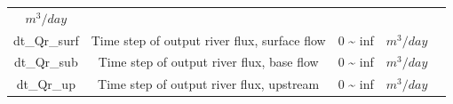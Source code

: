 \documentclass[]{scrbook}
\begin{document}
\begin{longtable}[]{@{}ccccc@{}}
\begin{minipage}[t]{0.10\columnwidth}
\(m^3/day\)\strut
\end{minipage} & \begin{minipage}[t]{0.26\columnwidth}\centering\strut
\strut
\end{minipage}\tabularnewline
\begin{minipage}[t]{0.17\columnwidth}\centering\strut
dt\_Qr\_surf\strut
\end{minipage} & \begin{minipage}[t]{0.23\columnwidth}\centering\strut
Time step of output river flux, surface flow\strut
\end{minipage} & \begin{minipage}[t]{0.10\columnwidth}\centering\strut
0 \textasciitilde{} inf\strut
\end{minipage} & \begin{minipage}[t]{0.10\columnwidth}\centering\strut
\(m^3/day\)\strut
\end{minipage} & \begin{minipage}[t]{0.26\columnwidth}\centering\strut
\strut
\end{minipage}\tabularnewline
\begin{minipage}[t]{0.17\columnwidth}\centering\strut
dt\_Qr\_sub\strut
\end{minipage} & \begin{minipage}[t]{0.23\columnwidth}\centering\strut
Time step of output river flux, base flow\strut
\end{minipage} & \begin{minipage}[t]{0.10\columnwidth}\centering\strut
0 \textasciitilde{} inf\strut
\end{minipage} & \begin{minipage}[t]{0.10\columnwidth}\centering\strut
\(m^3/day\)\strut
\end{minipage} & \begin{minipage}[t]{0.26\columnwidth}\centering\strut
\strut
\end{minipage}\tabularnewline
\begin{minipage}[t]{0.17\columnwidth}\centering\strut
dt\_Qr\_up\strut
\end{minipage} & \begin{minipage}[t]{0.23\columnwidth}\centering\strut
Time step of output river flux, upstream\strut
\end{minipage} & \begin{minipage}[t]{0.10\columnwidth}\centering\strut
0 \textasciitilde{} inf\strut
\end{minipage} & \begin{minipage}[t]{0.10\columnwidth}\centering\strut
\(m^3/day\)\strut
\end{minipage} & \begin{minipage}[t]{0.26\columnwidth}\centering\strut
\strut
\end{minipage}\tabularnewline
\bottomrule
\end{longtable}
\end{document}
